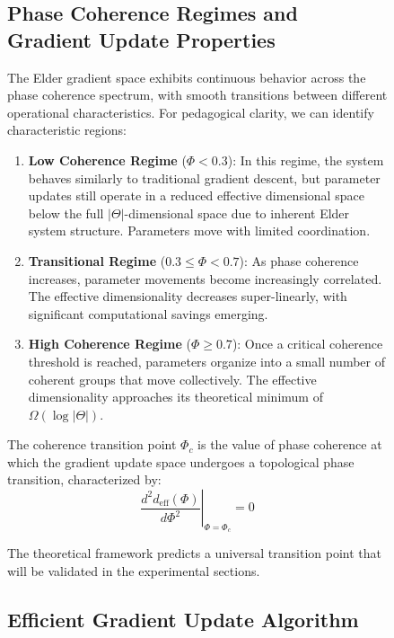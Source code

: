 \begin{figure}[ht]
\subsection{Phase Coherence Regimes and Gradient Update Properties}

The Elder gradient space exhibits continuous behavior across the phase coherence spectrum, with smooth transitions between different operational characteristics. For pedagogical clarity, we can identify characteristic regions:

\begin{enumerate}
    \item \textbf{Low Coherence Regime} ($\Phi < 0.3$): In this regime, the system behaves similarly to traditional gradient descent, but parameter updates still operate in a reduced effective dimensional space below the full $|\Theta|$-dimensional space due to inherent Elder system structure. Parameters move with limited coordination.
    
    \item \textbf{Transitional Regime} ($0.3 \leq \Phi < 0.7$): As phase coherence increases, parameter movements become increasingly correlated. The effective dimensionality decreases super-linearly, with significant computational savings emerging.
    
    \item \textbf{High Coherence Regime} ($\Phi \geq 0.7$): Once a critical coherence threshold is reached, parameters organize into a small number of coherent groups that move collectively. The effective dimensionality approaches its theoretical minimum of $\Omega(\log|\Theta|)$.
\end{enumerate}

\begin{definition}
The coherence transition point $\Phi_c$ is the value of phase coherence at which the gradient update space undergoes a topological phase transition, characterized by:
\begin{equation}
\left. \frac{d^2 d_{\text{eff}}(\Phi)}{d\Phi^2} \right|_{\Phi=\Phi_c} = 0
\end{equation}
\end{definition}

The theoretical framework predicts a universal transition point that will be validated in the experimental sections.



\subsection{Efficient Gradient Update Algorithm}


\end{figure}
